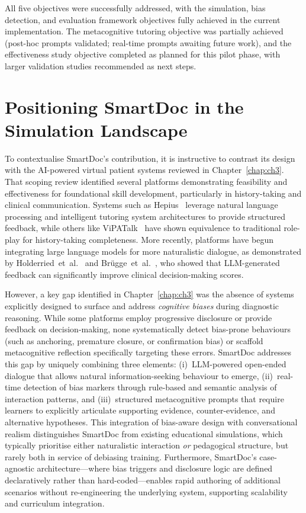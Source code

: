 \noindent
All five objectives were successfully addressed, with the simulation, bias detection, and
evaluation framework objectives fully achieved in the current implementation. The
metacognitive tutoring objective was partially achieved (post-hoc prompts validated;
real-time prompts awaiting future work), and the effectiveness study objective completed as
planned for this pilot phase, with larger validation studies recommended as next steps.

\section{Positioning SmartDoc in the Simulation Landscape}
\label{sec:comparison}

To contextualise SmartDoc's contribution, it is instructive to contrast its design with the
AI-powered virtual patient systems reviewed in Chapter~\ref{chap:ch3}. That scoping review
identified several platforms demonstrating feasibility and effectiveness for foundational
skill development, particularly in history-taking and clinical communication. Systems such
as Hepius~\parencite{furlan_natural_2021} leverage natural language processing and
intelligent tutoring system architectures to provide structured feedback, while others like
ViPATalk~\parencite{lippitsch_development_2024} have shown equivalence to traditional
role-play for history-taking completeness. More recently, platforms have begun integrating
large language models for more naturalistic dialogue, as demonstrated by
Holderried~et~al.~\parencite{holderried_generative_2024,holderried_language_2024} and
Brügge~et~al.~\parencite{brugge_large_2024}, who showed that LLM-generated feedback can
significantly improve clinical decision-making scores.

However, a key gap identified in Chapter~\ref{chap:ch3} was the absence of systems
explicitly designed to surface and address \emph{cognitive biases} during diagnostic
reasoning. While some platforms employ progressive disclosure or provide feedback on
decision-making, none systematically detect bias-prone behaviours (such as anchoring,
premature closure, or confirmation bias) or scaffold metacognitive reflection specifically
targeting these errors. SmartDoc addresses this gap by uniquely combining three elements:
(i)~LLM-powered open-ended dialogue that allows natural information-seeking behaviour to
emerge, (ii)~real-time detection of bias markers through rule-based and semantic analysis of
interaction patterns, and (iii)~structured metacognitive prompts that require learners to
explicitly articulate supporting evidence, counter-evidence, and alternative hypotheses.
This integration of bias-aware design with conversational realism distinguishes SmartDoc
from existing educational simulations, which typically prioritise either naturalistic
interaction \emph{or} pedagogical structure, but rarely both in service of debiasing
training. Furthermore, SmartDoc's case-agnostic architecture—where bias triggers and
disclosure logic are defined declaratively rather than hard-coded—enables rapid authoring of
additional scenarios without re-engineering the underlying system, supporting scalability
and curriculum integration.

